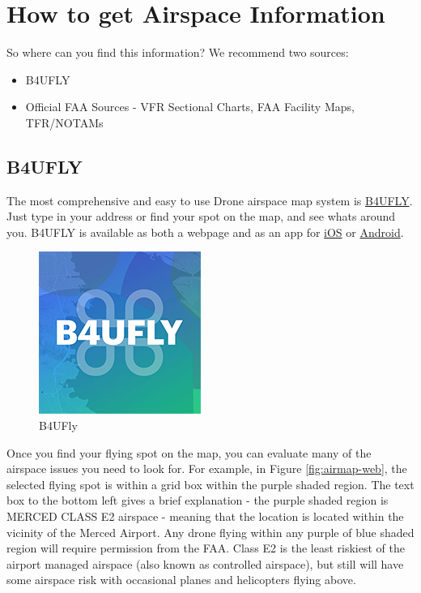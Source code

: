 \documentclass[
  12pt,
]{book}
\providecommand{\tightlist}{%
  \setlength{\itemsep}{0pt}\setlength{\parskip}{0pt}}
\begin{document}
\section{How to get Airspace Information}\label{how-to-get-airspace-information}

So where can you find this information? We recommend two sources:

\begin{itemize}
\tightlist
\item
  B4UFLY
\item
  Official FAA Sources - VFR Sectional Charts, FAA Facility Maps, TFR/NOTAMs
\end{itemize}

\subsection{B4UFLY}\label{b4ufly}

The most comprehensive and easy to use Drone airspace map system is \href{https://b4ufly.aloft.ai/}{B4UFLY}. Just type in your address or find your spot on the map, and see whats around you. B4UFLY is available as both a webpage and as an app for \href{https://apps.apple.com/us/app/b4ufly/id992427109?ls=1}{iOS} or \href{https://play.google.com/store/apps/details?id=gov.faa.b4ufly2}{Android}.

\begin{figure}

{\centering \includegraphics[width=0.5\linewidth]{images/B4UFLYlogo} 

}

\caption{B4UFly}\label{fig:b4ufly}
\end{figure}

Once you find your flying spot on the map, you can evaluate many of the airspace issues you need to look for. For example, in Figure \ref{fig:airmap-web}, the selected flying spot is within a grid box within the purple shaded region.
The text box to the bottom left gives a brief explanation - the purple shaded region is MERCED CLASS E2 airspace - meaning that the location is located within the vicinity of the Merced Airport. Any drone flying within any purple of blue shaded region will require permission from the FAA. Class E2 is the least riskiest of the airport managed airspace (also known as controlled airspace), but still will have some airspace risk with occasional planes and helicopters flying above.
\end{document}
